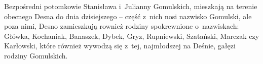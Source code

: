 Bezpośredni potomkowie Stanisława i~Julianny Gomulskich, mieszkają na terenie
obecnego Desna do dnia dzisiejszego -- część z~nich nosi nazwisko
Gomulski, ale poza nimi, Desno zamieszkują rownież rodziny spokrewnione
o~nazwiskach: Główka, Kochaniak, Banaszek, Dybek, Gryz, Rupniewski, Szatański,
Marczak czy Karłowski, które również wywodzą się z~tej, najmłodszej na Deśnie,
gałęzi rodziny Gomulskich.